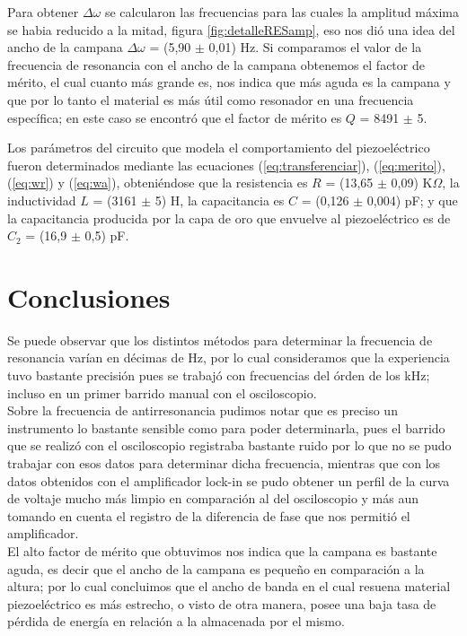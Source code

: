 \documentclass[twoside,twocolumn,a4paper]{article}
\begin{document}
Para obtener $\Delta \omega$ se calcularon las frecuencias para las cuales la amplitud m\'axima se habia reducido a la mitad, figura \ref{fig:detalleRESamp}, eso nos di\'o una idea del ancho de la campana $\Delta \omega$ = (5,90 $\pm$ 0,01) Hz. Si comparamos el valor de la frecuencia de resonancia con el ancho de la campana obtenemos el factor de m\'erito, el cual cuanto m\'as grande es, nos indica que m\'as aguda es la campana y que por lo tanto el material es m\'as \'util como resonador en una frecuencia espec\'ifica; en este caso se encontr\'o que el factor de m\'erito es $Q$ = 8491 $\pm$ 5.

Los par\'ametros del circuito que modela el comportamiento del piezoel\'ectrico fueron determinados mediante las ecuaciones (\ref{eq:transferenciar}), (\ref{eq:merito}), (\ref{eq:wr}) y (\ref{eq:wa}), obteni\'endose que la resistencia es $R$ = (13,65 $\pm$ 0,09) K$\Omega$, la inductividad $L$ = (3161 $\pm$ 5) H, la capacitancia es $C$ = (0,126 $\pm$ 0,004) pF; y que la capacitancia producida por la capa de oro que envuelve al piezoel\'ectrico es de $C_{2}$ = (16,9 $\pm$ 0,5) pF.


\section{Conclusiones}

Se puede observar que los distintos m\'etodos para determinar la frecuencia de resonancia var\'ian en d\'ecimas de Hz, por lo cual consideramos que la experiencia tuvo bastante precisi\'on pues se trabaj\'o con frecuencias del \'orden de los kHz; incluso en un primer barrido manual con el osciloscopio. \\

Sobre la frecuencia de antirresonancia pudimos notar que es preciso un instrumento lo bastante sensible como para poder determinarla, pues el barrido que se realiz\'o con el osciloscopio registraba bastante ruido por lo que no se pudo trabajar con esos datos para determinar dicha frecuencia, mientras que con los datos obtenidos con el amplificador lock-in se pudo obtener un perfil de la curva de voltaje mucho m\'as limpio en comparaci\'on al del osciloscopio y m\'as aun tomando en cuenta el registro de la diferencia de fase que nos permiti\'o el amplificador. \\

El alto factor de m\'erito que obtuvimos nos indica que la campana es bastante aguda, es decir que el ancho de la campana es peque\~no en comparaci\'on a la altura; por lo cual concluimos que el ancho de banda en el cual resuena material piezoel\'ectrico es m\'as estrecho, o visto de otra manera, posee una baja tasa de p\'erdida de energ\'ia en relaci\'on a la almacenada por el mismo.
\end{document}
